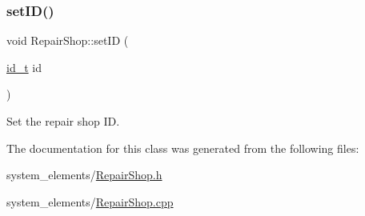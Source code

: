 \subsubsection{\texorpdfstring{set\+I\+D()}{setID()}}
{\footnotesize\ttfamily void Repair\+Shop\+::set\+ID (\begin{DoxyParamCaption}\item[{\mbox{\hyperlink{project__utils_8h_a8f3a969054ad2200720b96e7e23dd4e1}{id\+\_\+t}}}]{id }\end{DoxyParamCaption})}

Set the repair shop ID. 

The documentation for this class was generated from the following files\+:\begin{DoxyCompactItemize}
\item 
system\+\_\+elements/\mbox{\hyperlink{RepairShop_8h}{Repair\+Shop.\+h}}\item 
system\+\_\+elements/\mbox{\hyperlink{RepairShop_8cpp}{Repair\+Shop.\+cpp}}\end{DoxyCompactItemize}
